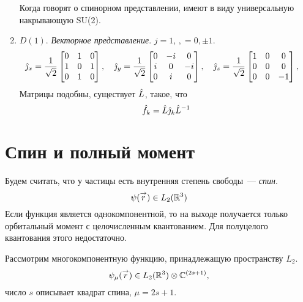 \begin{enumerate}
    Когда говорят о спинорном представлении, имеют в виду универсальную накрывающую SU(2).

    \item $D(1)$. \emph{Векторное представление}. $j = 1$, $, = 0, \pm 1$.
    $$
        \Hat \jmath_x = \dfrac{1}{\sqrt 2} \begin{bmatrix}
                                             0 & 1 & 0 \\
                                             1 & 0 & 1 \\
                                             0 & 1 & 0 \\
                                           \end{bmatrix}, \quad
        \Hat \jmath_y = \dfrac{1}{\sqrt 2} \begin{bmatrix}
                                             0 & -i & 0 \\
                                             i & 0 & -i \\
                                             0 & i & 0 \\
                                           \end{bmatrix}, \quad
        \Hat \jmath_z = \dfrac{1}{\sqrt 2} \begin{bmatrix}
                                             1 & 0 & 0 \\
                                             0 & 0 & 0 \\
                                             0 & 0 & -1 \\
                                           \end{bmatrix}, \quad
    $$
    Матрицы подобны, существует $\Hat L$, такое, что
    $$
        \Hat f_k = \Hat L \hat \jmath_k \Hat L^{-1}
    $$
\end{enumerate}
\section{Спин и полный момент}
Будем считать, что у частицы есть внутренняя степень свободы~--- \emph{спин}.
$$
    \psi(\overset{\to}{r}) \in L_2 (\mathbb {R}^3)
$$
Если функция является однокомпонентной, то на выходе получается только орбитальный момент с целочисленным квантованием. Для полуцелого квантования этого недостаточно.

Рассмотрим многокомпонентную функцию, принадлежащую пространству $L_2$.
$$
    \psi_\mu (\overset{\to}{r}) \in L_2 (\mathbb {R}^3) \otimes \mathbb {C}^{(2s+1)},
$$
число $s$ описывает квадрат спина, $\mu = 2s + 1$.

